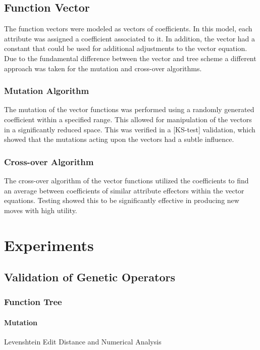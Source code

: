 \documentclass{acm_proc_article-sp}
\begin{document}
\subsection{Function Vector}

The function vectors were modeled as vectors of coefficients. In this model, each attribute was assigned a coefficient associated to it. In addition, the vector had a constant that could be used for additional adjustments to the vector equation. Due to the fundamental difference between the vector and tree scheme a different approach was taken for the mutation and cross-over algorithms. 

\subsubsection{Mutation Algorithm}
The mutation of the vector functions was performed using a randomly generated coefficient within a specified range. This allowed for manipulation of the vectors in a significantly reduced space. This was verified in a [KS-test] validation, which showed that the mutations acting upon the vectors had a subtle influence.

\subsubsection{Cross-over Algorithm}
The cross-over algorithm of the vector functions utilized the coefficients to find an average between coefficients of similar attribute effectors within the vector equations. Testing showed this to be significantly effective in producing new moves with high utility.

\section{Experiments}

\subsection{Validation of Genetic Operators}
\subsubsection{Function Tree}
\paragraph{Mutation}
Levenshtein Edit Distance and Numerical Analysis
\end{document}
